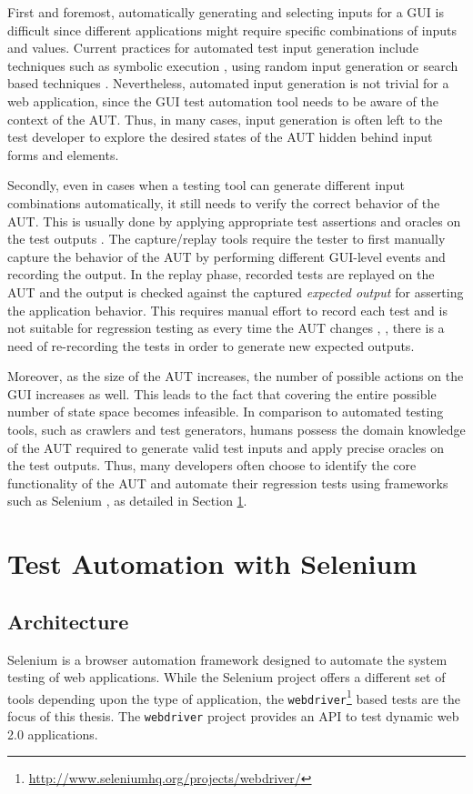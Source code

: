 First and foremost, automatically generating and selecting inputs for a GUI is difficult since different applications might require specific combinations of inputs and values. 
Current practices for automated test input generation include techniques such as symbolic execution \cite{Ganovetal}, using random input generation \cite{godefroid2005dart} or search based techniques \cite{gross2012search}. Nevertheless, automated input generation is not trivial for a web application, since the GUI test automation tool needs to be aware of the context of the AUT. Thus, in many cases, input generation is often left to the test developer to explore the desired states of the AUT hidden behind input forms and elements.

Secondly, even in cases when a testing tool can generate different input combinations automatically, it still needs to verify the correct behavior of the AUT. This is usually done by applying appropriate test assertions and oracles on the test outputs \cite{Baresi:Oracles}. The capture/replay tools \cite{joshi2006capture} require the tester to first manually capture the behavior of the AUT by performing different GUI-level events and recording the output. In the replay phase, recorded tests are replayed on the AUT and the output is checked against the captured \textit{expected output} for asserting the application behavior. This requires manual effort to record each test and is not suitable for regression testing as every time the AUT changes \cite{sjosten2006costs}, \cite{leotta2013capture}, there is a need of re-recording the tests in order to generate new expected outputs. 

Moreover, as the size of the AUT increases, the number of possible actions on the GUI increases as well. This leads to the fact that covering the entire possible number of state space becomes infeasible. In comparison to automated testing tools, such as crawlers and test generators, humans possess the domain knowledge of the AUT required to generate valid test inputs and apply precise oracles on the test outputs. Thus, many developers often choose to identify the core functionality of the AUT and automate their regression tests using frameworks such as Selenium \cite{websiteSelenium}, as detailed in Section \ref{sec:SeleniumTesting}.

\section{Test Automation with Selenium}
\label{sec:SeleniumTesting}
\subsection{Architecture}
\label{ssec:webdriverArchitecture}
Selenium is a browser automation framework designed to automate the system testing of web applications. While the Selenium project offers a different set of tools depending upon the type of application, the  \texttt{webdriver}\footnote{\url{http://www.seleniumhq.org/projects/webdriver/}} based tests are the focus of this thesis. The \texttt{webdriver} project provides an API to test dynamic web 2.0 applications. 

